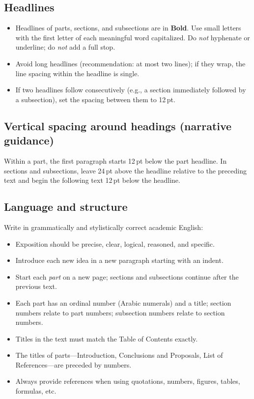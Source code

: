 \subsection*{Headlines}
\begin{itemize}
  \item Headlines of parts, sections, and subsections are in \textbf{Bold}. Use small letters with the first letter of each meaningful word capitalized. Do \emph{not} hyphenate or underline; do \emph{not} add a full stop.
  \item Avoid long headlines (recommendation: at most two lines); if they wrap, the line spacing within the headline is single.
  \item If two headlines follow consecutively (e.g., a section immediately followed by a subsection), set the spacing between them to 12\,pt.
\end{itemize}

\subsection*{Vertical spacing around headings (narrative guidance)}
Within a part, the first paragraph starts 12\,pt below the part headline. In sections and subsections, leave 24\,pt above the headline relative to the preceding text and begin the following text 12\,pt below the headline.

\subsection*{Language and structure}
Write in grammatically and stylistically correct academic English:
\begin{itemize}
  \item Exposition should be precise, clear, logical, reasoned, and specific.
  \item Introduce each new idea in a new paragraph starting with an indent.
  \item Start each \emph{part} on a new page; sections and subsections continue after the previous text.
  \item Each part has an ordinal number (Arabic numerals) and a title; section numbers relate to part numbers; subsection numbers relate to section numbers.
  \item Titles in the text must match the Table of Contents exactly.
  \item The titles of parts—Introduction, Conclusions and Proposals, List of References—are preceded by numbers.
  \item Always provide references when using quotations, numbers, figures, tables, formulas, etc.
\end{itemize}

